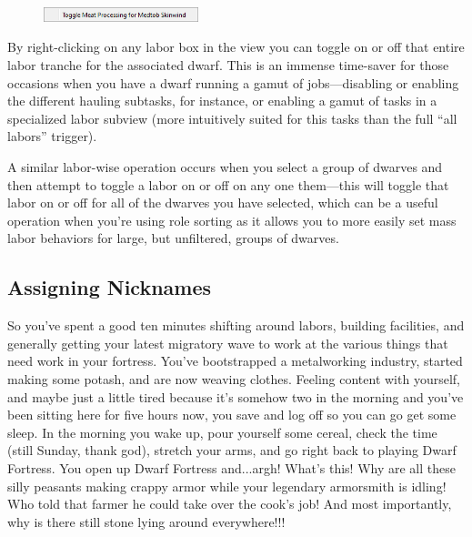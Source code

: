 \documentclass[]{article}
\begin{document}
\begin{figure}
\vspace{-20pt}
  \begin{center}
    \includegraphics[width=0.4\textwidth]{Sec2Fig5-4}
  \end{center}
\vspace{-10pt}
\end{figure}
By right-clicking on any labor box in the view you can toggle on or off that entire labor
tranche for the associated dwarf. This is an immense time-saver for those occasions when you have a
dwarf running a gamut of jobs---disabling or enabling the different hauling subtasks, for instance, or
enabling a gamut of tasks in a specialized labor subview (more intuitively suited for this tasks than
the full ``all labors'' trigger).

A similar labor-wise operation occurs when you select a group of dwarves and then attempt to toggle a labor on or off on any one them---this will toggle that labor on or off for all of the dwarves you have selected, which can be a useful operation when you're using role sorting as it allows you to more easily set mass labor behaviors for large, but unfiltered, groups of dwarves.

\newpage
\subsection{Assigning Nicknames}
\label{sec:Assigning Nicknames}

So you've spent a good ten minutes shifting around labors, building facilities, and generally getting
your latest migratory wave to work at the various things that need work in your fortress. You've
bootstrapped a metalworking industry, started making some potash, and are now weaving clothes. Feeling
content with yourself, and maybe just a little tired because it's somehow two in the morning and you've
been sitting here for five hours now, you save and log off so you can go get some sleep. In the morning
you wake up, pour yourself some cereal, check the time (still Sunday, thank god), stretch your arms, and
go right back to playing Dwarf Fortress. You open up Dwarf Fortress and...argh! What's this! Why are all
these silly peasants making crappy armor while your legendary armorsmith is idling! Who told that farmer
he could take over the cook's job! And most importantly, why is there still stone lying around
everywhere!!!
\end{document}
